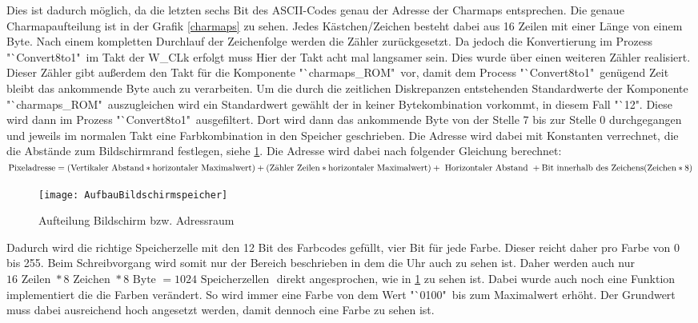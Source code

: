 \documentclass[12pt,a4paper,bibliography=totoc,listof=totoc]{scrartcl}
\begin{document}
Dies ist dadurch möglich, da die letzten sechs Bit des ASCII-Codes genau der Adresse der Charmaps entsprechen. Die genaue Charmapaufteilung ist in 
der Grafik \ref{charmaps} zu sehen. Jedes Kästchen/Zeichen besteht dabei aus 16 Zeilen mit einer Länge von einem Byte. Nach einem kompletten 
Durchlauf der Zeichenfolge werden die Zähler zurückgesetzt. Da jedoch die Konvertierung im Prozess "`Convert8to1" \,im Takt der W\_CLk erfolgt muss 
Hier der Takt acht mal langsamer sein. Dies wurde über einen weiteren Zähler realisiert. Dieser Zähler gibt außerdem den Takt für die Komponente 
"`charmaps\_ROM" \,vor, damit dem Process "`Convert8to1" \,genügend Zeit bleibt das ankommende Byte auch zu verarbeiten. Um die durch die zeitlichen 
Diskrepanzen entstehenden Standardwerte der Komponente "`charmaps\_ROM"\, auszugleichen wird ein Standardwert gewählt der in keiner Bytekombination 
vorkommt, in diesem Fall "`12". Diese wird dann im Prozess "`Convert8to1" \,ausgefiltert.
Dort wird dann das ankommende Byte von der Stelle 7 bis zur Stelle 0 durchgegangen und jeweils im normalen Takt eine 
Farbkombination in den Speicher geschrieben. Die Adresse wird dabei mit Konstanten verrechnet, die die Abstände zum Bildschirmrand festlegen, siehe 
\ref{bildschirm}. Die Adresse wird dabei nach folgender Gleichung berechnet: 
{\centering
\newline
$\text{Pixeladresse} = (\text{Vertikaler Abstand} * 
\text{horizontaler Maximalwert}) + (\text{Zähler Zeilen} * \text{horizontaler Maximalwert}) + \text{ Horizontaler Abstand } + 
\text{Bit innerhalb des Zeichens}\newline (\text{Zeichen} * 8)$
\newline 
}
\begin{figure}[htbp]
	\centering
	\texttt{[image: AufbauBildschirmspeicher]}
	\caption{Aufteilung Bildschirm bzw. Adressraum}
	\label{bildschirm}
\end{figure} 
Dadurch wird die richtige Speicherzelle mit den 12 Bit des Farbcodes gefüllt, vier Bit für jede Farbe. 
Dieser reicht daher pro Farbe von 0 bis 255. Beim Schreibvorgang wird somit nur der Bereich beschrieben in dem die Uhr auch zu sehen ist. 
Daher werden auch nur $16 \text{ Zeilen } * 8 \text{ Zeichen } * 8 \text{ Byte } = 1024 \text{ Speicherzellen }$ direkt angesprochen, wie in \ref{bildschirm} zu sehen ist.
Dabei wurde auch noch eine Funktion implementiert die die Farben verändert. So wird immer eine Farbe von dem Wert "`0100"\, bis zum Maximalwert erhöht. 
Der Grundwert muss dabei ausreichend hoch angesetzt werden, damit dennoch eine Farbe zu sehen ist. 
\end{document}
